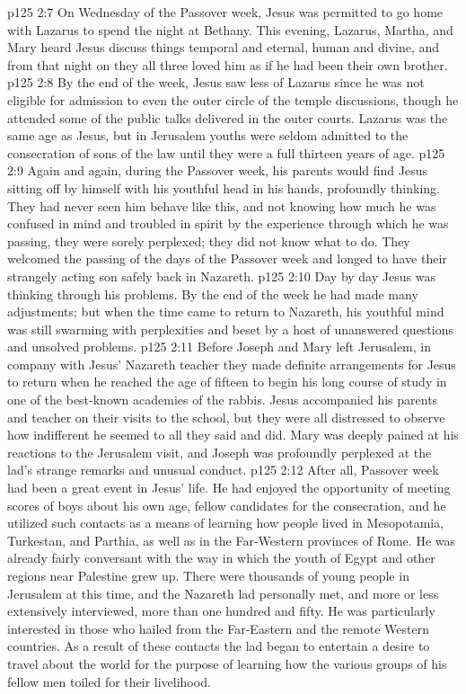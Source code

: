 \vs p125 2:7 On Wednesday of the Passover week, Jesus was permitted to go home with Lazarus to spend the night at Bethany. This evening, Lazarus, Martha, and Mary heard Jesus discuss things temporal and eternal, human and divine, and from that night on they all three loved him as if he had been their own brother.
\vs p125 2:8 By the end of the week, Jesus saw less of Lazarus since he was not eligible for admission to even the outer circle of the temple discussions, though he attended some of the public talks delivered in the outer courts. Lazarus was the same age as Jesus, but in Jerusalem youths were seldom admitted to the consecration of sons of the law until they were a full thirteen years of age.
\vs p125 2:9 Again and again, during the Passover week, his parents would find Jesus sitting off by himself with his youthful head in his hands, profoundly thinking. They had never seen him behave like this, and not knowing how much he was confused in mind and troubled in spirit by the experience through which he was passing, they were sorely perplexed; they did not know what to do. They welcomed the passing of the days of the Passover week and longed to have their strangely acting son safely back in Nazareth.
\vs p125 2:10 Day by day Jesus was thinking through his problems. By the end of the week he had made many adjustments; but when the time came to return to Nazareth, his youthful mind was still swarming with perplexities and beset by a host of unanswered questions and unsolved problems.
\vs p125 2:11 Before Joseph and Mary left Jerusalem, in company with Jesus’ Nazareth teacher they made definite arrangements for Jesus to return when he reached the age of fifteen to begin his long course of study in one of the best\hyp{}known academies of the rabbis. Jesus accompanied his parents and teacher on their visits to the school, but they were all distressed to observe how indifferent he seemed to all they said and did. Mary was deeply pained at his reactions to the Jerusalem visit, and Joseph was profoundly perplexed at the lad’s strange remarks and unusual conduct.
\vs p125 2:12 After all, Passover week had been a great event in Jesus’ life. He had enjoyed the opportunity of meeting scores of boys about his own age, fellow candidates for the consecration, and he utilized such contacts as a means of learning how people lived in Mesopotamia, Turkestan, and Parthia, as well as in the Far\hyp{}Western provinces of Rome. He was already fairly conversant with the way in which the youth of Egypt and other regions near Palestine grew up. There were thousands of young people in Jerusalem at this time, and the Nazareth lad personally met, and more or less extensively interviewed, more than one hundred and fifty. He was particularly interested in those who hailed from the Far\hyp{}Eastern and the remote Western countries. As a result of these contacts the lad began to entertain a desire to travel about the world for the purpose of learning how the various groups of his fellow men toiled for their livelihood.
